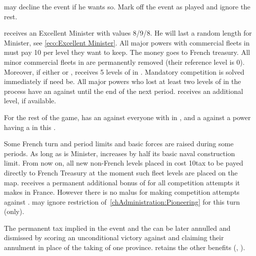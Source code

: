 
\condition{}
\aparag \FRA may decline the event if he wants so. Mark off the event as
played and ignore the rest.

\phevnt
\aparag \FRA receives an Excellent Minister  with
values 8/9/8. He will last a random length for Minister, see
\ref{eco:Excellent Minister}.
\aparag All major powers with commercial fleets in  must pay 10
\ducats per level they want to keep. The money goes to French treasury. All
minor commercial fleets in  are permanently removed (their
reference level is 0).
\aparag Moreover, if either \CATHCR or \CATHCO, \FRA receives 5 levels of
\TradeFLEET in .  Mandatory competition is solved immediately if
need be.
\aparag All major powers who lost at least two levels of \TradeFLEET in the
process have an \OCB against \FRA until the end of the next period.
\aparag \FRA receives an additional  \MNU level, if available.

\phdipl
\aparag For the rest of the game, \FRA has an \OCB against everyone with
\TradeFLEET in , and a \CB against a power having a
\TradeFLEET\faceplus in this \CTZ.

\phadm
\aparag\label{pV:Colbert:limits} Some French turn and period limits and basic
forces are raised during some periods.
\aparag As long as \ministreColbert is Minister, \FRA increases by half its
basic naval construction limit.
\aparag From now on, all new non-French \TradeFLEET levels placed in
 cost 10\ducats tax to be payed directly to French Treasury at the
moment such fleet levels are placed on the map.
\aparag\label{pV:Colbert:CB} \FRA receives a permanent additional bonus of
 for all competition attempts it makes in \CTZ France. However there
is no malus for making competition attempts against \FRA.
\aparag \FRA may ignore restriction of~\ref{chAdministration:Pioneering} for
this turn (only).

\phpaix
\aparag The permanent tax implied in the event and the \CB can be later
annulled and \ministreColbert dismissed by scoring an unconditional victory
against \FRA and claiming their annulment in place of the taking of one
province. \FRA retains the other benefits (,
).




